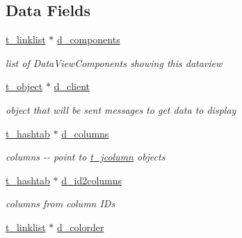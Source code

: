 \subsection*{Data Fields}
\begin{DoxyCompactItemize}
\item 
\hypertarget{structt__jdataview_a98679942e8ec7e62f04e63f84f9c5ac1}{
\hyperlink{structt__linklist}{t\_\-linklist} $\ast$ \hyperlink{structt__jdataview_a98679942e8ec7e62f04e63f84f9c5ac1}{d\_\-components}}
\label{structt__jdataview_a98679942e8ec7e62f04e63f84f9c5ac1}

\begin{DoxyCompactList}\small\item\em list of DataViewComponents showing this dataview \item\end{DoxyCompactList}\item 
\hypertarget{structt__jdataview_a6e4ced20bd1e6caa51b3ad040e0f7b52}{
\hyperlink{structt__object}{t\_\-object} $\ast$ \hyperlink{structt__jdataview_a6e4ced20bd1e6caa51b3ad040e0f7b52}{d\_\-client}}
\label{structt__jdataview_a6e4ced20bd1e6caa51b3ad040e0f7b52}

\begin{DoxyCompactList}\small\item\em object that will be sent messages to get data to display \item\end{DoxyCompactList}\item 
\hypertarget{structt__jdataview_a5aa8158d67969e9a6571bf560ebfa909}{
\hyperlink{structt__hashtab}{t\_\-hashtab} $\ast$ \hyperlink{structt__jdataview_a5aa8158d67969e9a6571bf560ebfa909}{d\_\-columns}}
\label{structt__jdataview_a5aa8158d67969e9a6571bf560ebfa909}

\begin{DoxyCompactList}\small\item\em columns -\/-\/ point to \hyperlink{structt__jcolumn}{t\_\-jcolumn} objects \item\end{DoxyCompactList}\item 
\hypertarget{structt__jdataview_a92aca8b8e288b1e95f33438f3c69649b}{
\hyperlink{structt__hashtab}{t\_\-hashtab} $\ast$ \hyperlink{structt__jdataview_a92aca8b8e288b1e95f33438f3c69649b}{d\_\-id2columns}}
\label{structt__jdataview_a92aca8b8e288b1e95f33438f3c69649b}

\begin{DoxyCompactList}\small\item\em columns from column IDs \item\end{DoxyCompactList}\item 
\hypertarget{structt__jdataview_aa4e072d833da84b58d512a52623cdc00}{
\hyperlink{structt__linklist}{t\_\-linklist} $\ast$ \hyperlink{structt__jdataview_aa4e072d833da84b58d512a52623cdc00}{d\_\-colorder}}
\label{structt__jdataview_aa4e072d833da84b58d512a52623cdc00}


\end{DoxyCompactItemize}
